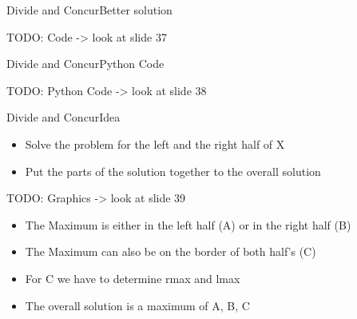 
\begin{frame}{Divide and Concur}{Better solution}
	
	TODO: Code -> look at slide 37 \vspace{2em}
	
\end{frame}


\begin{frame}{Divide and Concur}{Python Code}
	
	TODO: Python Code -> look at slide 38 \vspace{2em}
	
\end{frame}


\begin{frame}{Divide and Concur}{Idea}
	\begin{itemize}
		\item
		Solve the problem for the left and the right half of X
		\item
			Put the parts of the solution together to the overall solution
	\end{itemize}
	
	TODO: Graphics -> look at slide 39 \vspace{2em}
	
	\begin{itemize}
		\item
			The Maximum is either in the left half (A) or in the right half (B)
		\item
			The Maximum can also be on the border of both half's (C) 
		\item
			For C we have to determine rmax and lmax
		\item
			The overall solution is a maximum of A, B, C
	\end{itemize}
\end{frame}



